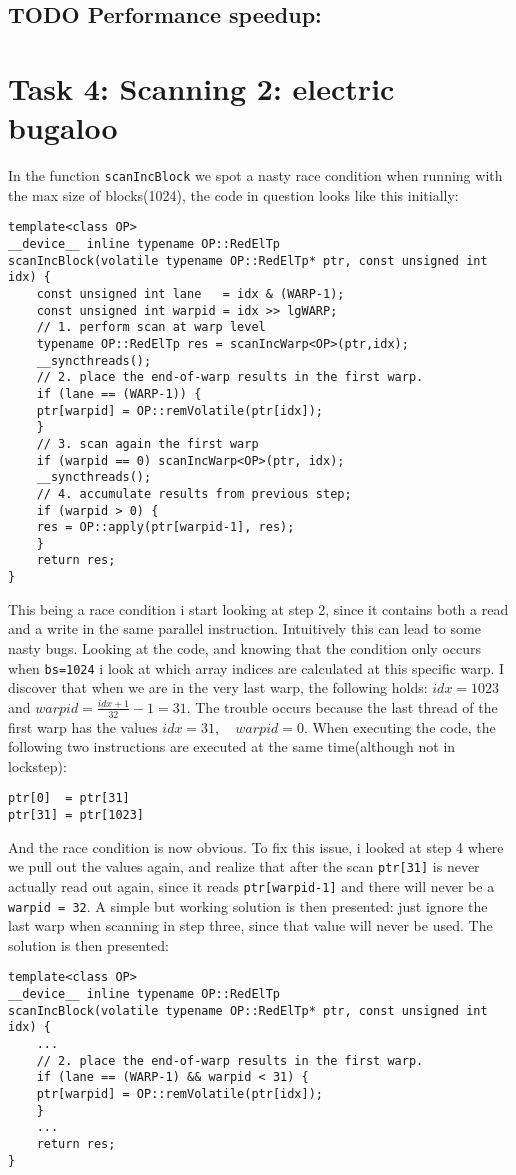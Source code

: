 \documentclass[11pt]{article}
\begin{document}
\subsection{{\bfseries\sffamily TODO} Performance speedup:}
\label{sec:org93062b6}
\section{Task 4: Scanning 2: electric bugaloo}
\label{sec:orgc9f3889}
In the function \texttt{scanIncBlock} we spot a nasty race condition when running
with the max size of blocks(1024), the code in question looks like this initially:
\begin{verbatim}
template<class OP>
__device__ inline typename OP::RedElTp
scanIncBlock(volatile typename OP::RedElTp* ptr, const unsigned int idx) {
    const unsigned int lane   = idx & (WARP-1);
    const unsigned int warpid = idx >> lgWARP;
    // 1. perform scan at warp level
    typename OP::RedElTp res = scanIncWarp<OP>(ptr,idx);
    __syncthreads();
    // 2. place the end-of-warp results in the first warp.
    if (lane == (WARP-1)) { 
	ptr[warpid] = OP::remVolatile(ptr[idx]);
    }
    // 3. scan again the first warp
    if (warpid == 0) scanIncWarp<OP>(ptr, idx);
    __syncthreads();
    // 4. accumulate results from previous step;
    if (warpid > 0) {
	res = OP::apply(ptr[warpid-1], res);
    }
    return res;
}
\end{verbatim}
This being a race condition i start looking at step 2, since it contains
both a read and a write in the same parallel instruction. Intuitively
this can lead to some nasty bugs.  
Looking at the code, and knowing that the condition only occurs when \texttt{bs=1024}
i look at which array indices are calculated at this specific warp.
I discover that when we are in the very last warp, the following holds:
\(idx = 1023\) and \(warpid = \frac{idx+1}{32}-1 = 31\). The trouble occurs
because the last thread of the first warp has the values \(idx = 31, \quad warpid=0\).  
When executing the code, the following two instructions are executed at the 
same time(although not in lockstep):
\begin{verbatim}
ptr[0]  = ptr[31]
ptr[31] = ptr[1023]
\end{verbatim}
And the race condition is now obvious.  
To fix this issue, i looked at step 4 where we pull out the values again,
and realize that after the scan \texttt{ptr[31]} is never actually read out again,
since it reads \texttt{ptr[warpid-1]} and there will never be a \texttt{warpid = 32}.
A simple but working solution is then presented: just ignore the last warp
when scanning in step three, since that value will never be used. The
solution is then presented:
\begin{verbatim}
template<class OP>
__device__ inline typename OP::RedElTp
scanIncBlock(volatile typename OP::RedElTp* ptr, const unsigned int idx) {
    ...
    // 2. place the end-of-warp results in the first warp.
    if (lane == (WARP-1) && warpid < 31) { 
	ptr[warpid] = OP::remVolatile(ptr[idx]);
    }
    ...
    return res;
}
\end{verbatim}
\end{document}

